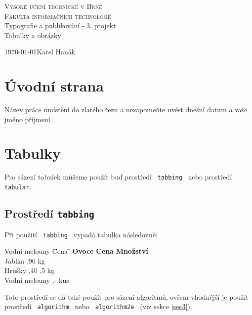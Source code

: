 \documentclass[11pt,a4paper]{article}
\begin{document}
\begin{titlepage}
\begin{center}
{\Huge \textsc{Vysoké učení technické v Brně\\[0,3em]{\huge Fakulta informačních technologií}}}\\
{{\LARGE Typografie a publikování - 3. projekt}\\[0,4em]{\Huge Tabulky a obrázky}}\\
\end{center}
{\Large \today \hfill Karel Hanák}
\end{titlepage}
\section{Úvodní strana \label{sec1}}
Název práce umístění do zlatého řezu a nezapomeňte uvést dnešní datum a vaše jméno příjmení.
\section{Tabulky \label{sec2}}
Pro sázení tabulek můžeme použít buď prostředí \texttt{ tabbing } nebo prostředí \texttt{ tabular}.
\subsection{Prostředí \texttt{tabbing} \label{sec2_1}}
Při použití \texttt{ tabbing } vypadá tabulka následovně:

\begin{tabbing}
Vodní melouny \quad \= Cena \quad \= \kill
\textbf{Ovoce} \> \textbf{Cena} \> \textbf{Množství} \\
Jablka ,90  kg \\
Hrušky ,40 ,5 kg \\
Vodní melouny ,-  kus \\
\end{tabbing}
Toto prostředí se dá také použít pro sázení algoritmů, ovšem vhodnější je použít prostředí \texttt{ algorithm } nebo \texttt{ algorithm2e } (viz sekce \ref{sec3}).
\end{document}
